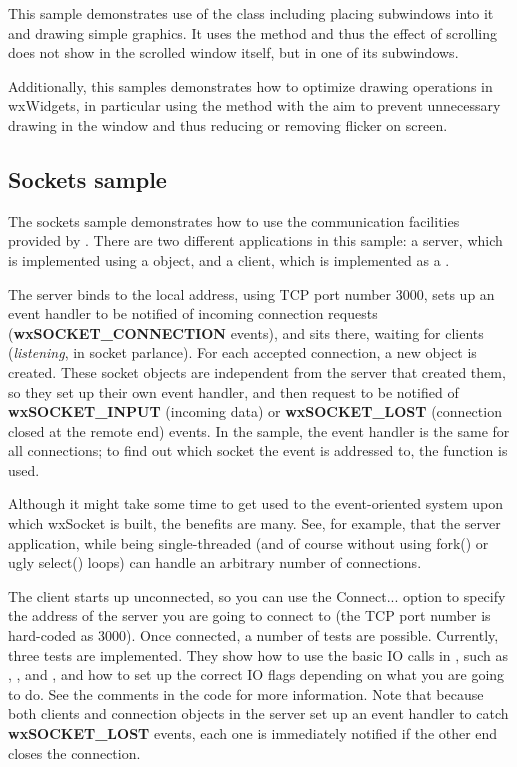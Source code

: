 This sample demonstrates use of the 
class including placing subwindows into it and drawing simple graphics. It uses the
 method and thus the effect
of scrolling does not show in the scrolled window itself, but in one of its subwindows.

Additionally, this samples demonstrates how to optimize drawing operations in wxWidgets,
in particular using the  method with
the aim to prevent unnecessary drawing in the window and thus reducing or removing
flicker on screen.


\subsection{Sockets sample}\label{samplesockets}

The sockets sample demonstrates how to use the communication facilities
provided by . There are two different
applications in this sample: a server, which is implemented using a
 object, and a client, which
is implemented as a .

The server binds to the local address, using TCP port number 3000,
sets up an event handler to be notified of incoming connection requests
({\bf wxSOCKET\_CONNECTION} events), and sits there, waiting for clients
({\it listening}, in socket parlance). For each accepted connection,
a new  object is created. These
socket objects are independent from the server that created them, so
they set up their own event handler, and then request to be notified
of {\bf wxSOCKET\_INPUT} (incoming data) or {\bf wxSOCKET\_LOST}
(connection closed at the remote end) events. In the sample, the event
handler is the same for all connections; to find out which socket the
event is addressed to, the  function
is used.

Although it might take some time to get used to the event-oriented
system upon which wxSocket is built, the benefits are many. See, for
example, that the server application, while being single-threaded
(and of course without using fork() or ugly select() loops) can handle
an arbitrary number of connections.

The client starts up unconnected, so you can use the Connect... option
to specify the address of the server you are going to connect to (the
TCP port number is hard-coded as 3000). Once connected, a number of
tests are possible. Currently, three tests are implemented. They show
how to use the basic IO calls in ,
such as , ,
 and ,
and how to set up the correct IO flags depending on what you are going to
do. See the comments in the code for more information. Note that because
both clients and connection objects in the server set up an event handler
to catch {\bf wxSOCKET\_LOST} events, each one is immediately notified
if the other end closes the connection.

